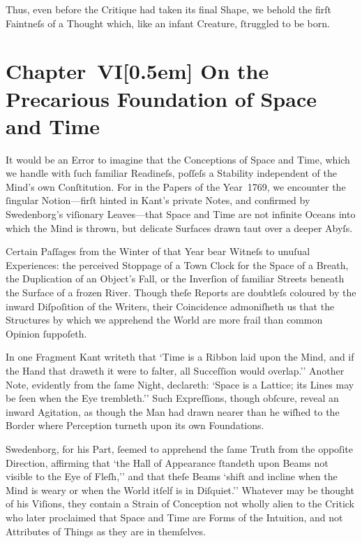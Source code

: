 \documentclass[12pt]{book}
\begin{document}
Thus, even before the Critique had taken its final Shape, we behold the firſt Faintneſs of a Thought which, like an infant Creature, ſtruggled to be born.


\chapter*{Chapter~VI[0.5em]
On the Precarious Foundation of Space and Time}


It would be an Error to imagine that the Conceptions of Space and Time, which we handle with ſuch familiar Readineſs, poſſeſs a Stability independent of the Mind’s own Conſtitution. For in the Papers of the Year~1769, we encounter the ſingular Notion—firſt hinted in Kant’s private Notes, and confirmed by Swedenborg’s viſionary Leaves—that Space and Time are not infinite Oceans into which the Mind is thrown, but delicate Surfaces drawn taut over a deeper Abyſs.

Certain Paſſages from the Winter of that Year bear Witneſs to unuſual Experiences: the perceived Stoppage of a Town Clock for the Space of a Breath, the Duplication of an Object’s Fall, or the Inverſion of familiar Streets beneath the Surface of a frozen River. Though theſe Reports are doubtleſs coloured by the inward Diſpoſition of the Writers, their Coincidence admoniſheth us that the Structures by which we apprehend the World are more frail than common Opinion ſuppoſeth.

In one Fragment Kant writeth that `Time is a Ribbon laid upon the Mind, and if the Hand that draweth it were to falter, all Succeſſion would overlap.'' Another Note, evidently from the ſame Night, declareth: `Space is a Lattice; its Lines may be ſeen when the Eye trembleth.'' Such Expreſſions, though obſcure, reveal an inward Agitation, as though the Man had drawn nearer than he wiſhed to the Border where Perception turneth upon its own Foundations.

Swedenborg, for his Part, ſeemed to apprehend the ſame Truth from the oppoſite Direction, affirming that `the Hall of Appearance ſtandeth upon Beams not visible to the Eye of Fleſh,'' and that theſe Beams `shift and incline when the Mind is weary or when the World itſelf is in Diſquiet.'' Whatever may be thought of his Viſions, they contain a Strain of Conception not wholly alien to the Critick who later proclaimed that Space and Time are Forms of the Intuition, and not Attributes of Things as they are in themſelves.
\end{document}
